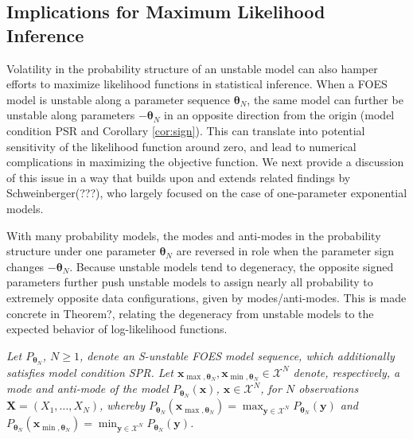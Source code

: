 \documentclass[12pt]{article}
\theoremstyle{definition}
\begin{document}
{\subsection{Implications for Maximum Likelihood Inference}

Volatility  in the probability structure of an unstable model can also
hamper efforts to maximize likelihood functions in statistical
inference. When a FOES model is unstable along a parameter
sequence \(\boldsymbol \theta_N\), the same model can further be
unstable along parameters \(-\boldsymbol \theta_N\) in an opposite direction from the
origin  (model condition PSR and Corollary \ref{cor:sign}).
   This can translate into
potential  sensitivity of the likelihood function around zero,  and lead to  numerical complications in
maximizing the objective function.  We next provide a discussion of this issue in a way that builds upon and extends  related findings by Schweinberger(???), who largely focused on the case of one-parameter exponential models.

    With many probability models, the modes and anti-modes in the probability structure under one parameter \( \boldsymbol \theta_N\) are reversed in  role  when the parameter sign   changes \(-\boldsymbol \theta_N\).
Because unstable models tend to degeneracy,
the opposite signed parameters  further push unstable models to assign nearly all probability to extremely opposite data configurations, given by modes/anti-modes.  This is made concrete in Theorem?,  relating the degeneracy from unstable models to the expected behavior of log-likelihood functions.




\begin{theorem1}
\label{thm:something}  {\it Let $P_{\boldsymbol \theta_N}$, $N \geq 1$, denote an S-unstable FOES model sequence, which additionally satisfies model condition SPR.  Let $\boldsymbol{x}_{\max, \boldsymbol \theta_N},\boldsymbol{x}_{\min, \boldsymbol \theta_N}\in\mathcal{X}^N$ denote, respectively, a mode and anti-mode of the model $P_{\boldsymbol \theta_N}(\boldsymbol x)$, $\boldsymbol x\in\mathcal{X}^N$, for $N$ observations $\boldsymbol X =(X_1,\ldots,X_N)$,
whereby $P_{\boldsymbol \theta_N }(\boldsymbol{x}_{\max, \boldsymbol \theta_N}) = \max_{\boldsymbol y\in\mathcal{X}^N} P_{\boldsymbol \theta_N }(\boldsymbol y)$ and $P_{\boldsymbol \theta_N }(\boldsymbol{x}_{\min, \boldsymbol \theta_N}) = \min_{\boldsymbol y\in\mathcal{X}^N} P_{\boldsymbol \theta_N }(\boldsymbol y)$.


}
\end{theorem1}}
\end{document}

